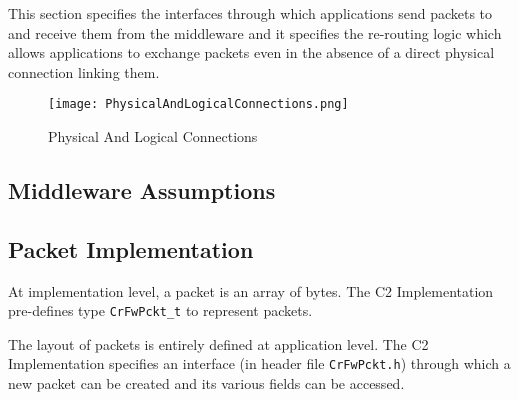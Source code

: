 \documentclass{pnp_article}
\begin{document}
This section specifies the interfaces through which applications send packets to and receive them from the middleware and it specifies the re-routing logic which allows applications to exchange packets even in the absence of a direct physical connection linking them. 

\begin{figure}[ht]
 \centering
 \texttt{[image: PhysicalAndLogicalConnections.png]}
 \caption{Physical And Logical Connections}
 \label{fig:PhysicalAndLogicalConnections}
\end{figure} 

\subsection{Middleware Assumptions}\label{sec:MwAssumptions}
 




\subsection{Packet Implementation}\label{sec:PcktImpl}

At implementation level, a packet is an array of bytes. The C2 Implementation pre-defines type \texttt{CrFwPckt\_t} to represent packets.

The layout of packets is entirely defined at application level. The C2 Implementation specifies an interface (in header file \texttt{CrFwPckt.h}) through which a new packet can be created and its various fields can be accessed. 
\end{document}
